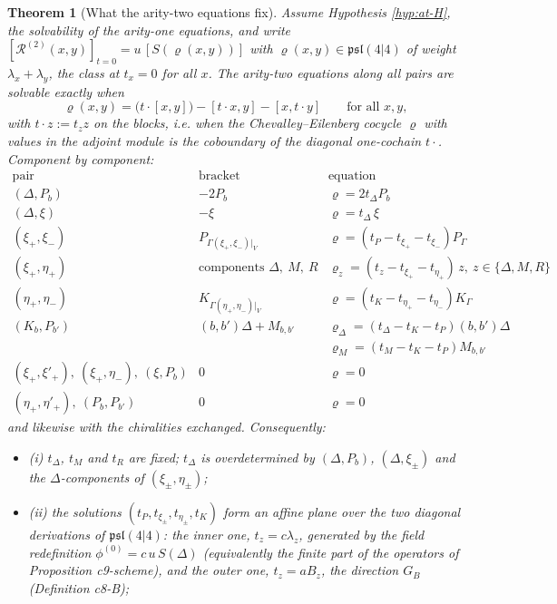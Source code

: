 \documentclass[11pt]{article}
\numberwithin{equation}{section}
\theoremstyle{plain}
\newtheorem{theorem}{Theorem}[section]
\theoremstyle{definition}
\begin{document}
\begin{theorem}[What the arity-two equations fix]
\label{thm:at-fix}
Assume Hypothesis \ref{hyp:at-H}, the solvability of the arity-one equations, and write $[\mathcal R^{(2)}(x,y)]_{t=0}=u\,[S(\varrho(x,y))]$ with $\varrho(x,y)\in\mathfrak{psl}(4|4)$ of weight $\lambda_x+\lambda_y$, the class at $t_x=0$ for all $x$. The arity-two equations along all pairs are solvable exactly when
\begin{equation}
\varrho(x,y)=\big(t\cdot[x,y]\big)-[t\cdot x,y]-[x,t\cdot y]\qquad\text{for all }x,y,
\label{eq:at-rho}
\end{equation}
with $t\cdot z:=t_zz$ on the blocks, i.e. when the Chevalley--Eilenberg cocycle $\varrho$ with values in the adjoint module is the coboundary of the diagonal one-cochain $t\cdot$. Component by component:
\[
\begin{array}{l|l|l}
\text{pair} & \text{bracket} & \text{equation}\\
\hline
(\Delta,P_b) & -2P_b & \varrho=2t_\Delta P_b\\
(\Delta,\xi) & -\xi & \varrho=t_\Delta\,\xi\\
(\xi_+,\xi_-) & P_{\Gamma(\xi_+,\xi_-)|_V} & \varrho=(t_P-t_{\xi_+}-t_{\xi_-})P_{\Gamma}\\
(\xi_+,\eta_+) & \text{components }\Delta,\ M,\ R & \varrho_z=(t_z-t_{\xi_+}-t_{\eta_+})\,z,\ z\in\{\Delta,M,R\}\\
(\eta_+,\eta_-) & K_{\Gamma(\eta_+,\eta_-)|_V} & \varrho=(t_K-t_{\eta_+}-t_{\eta_-})K_{\Gamma}\\
(K_b,P_{b'}) & (b,b')\Delta+M_{b,b'} & \varrho_\Delta=(t_\Delta-t_K-t_P)(b,b')\Delta\\
 & & \varrho_M=(t_M-t_K-t_P)M_{b,b'}\\
(\xi_+,\xi'_+),\ (\xi_+,\eta_-),\ (\xi,P_b) & 0 & \varrho=0\\
(\eta_+,\eta'_+),\ (P_b,P_{b'}) & 0 & \varrho=0
\end{array}
\]
and likewise with the chiralities exchanged. Consequently:
\begin{itemize}
\item (i) $t_\Delta$, $t_M$ and $t_R$ are fixed; $t_\Delta$ is overdetermined by $(\Delta,P_b)$, $(\Delta,\xi_\pm)$ and the $\Delta$-components of $(\xi_\pm,\eta_\pm)$;
\item (ii) the solutions $(t_P,t_{\xi_\pm},t_{\eta_\pm},t_K)$ form an affine plane over the two diagonal derivations of $\mathfrak{psl}(4|4)$: the inner one, $t_z=c\lambda_z$, generated by the field redefinition $\phi^{(0)}=c\,u\,S(\Delta)$ (equivalently the finite part of the operators of Proposition c9-scheme), and the outer one, $t_z=aB_z$, the direction $G_B$ (Definition c8-B);

\end{itemize}
\end{theorem}
\end{document}
